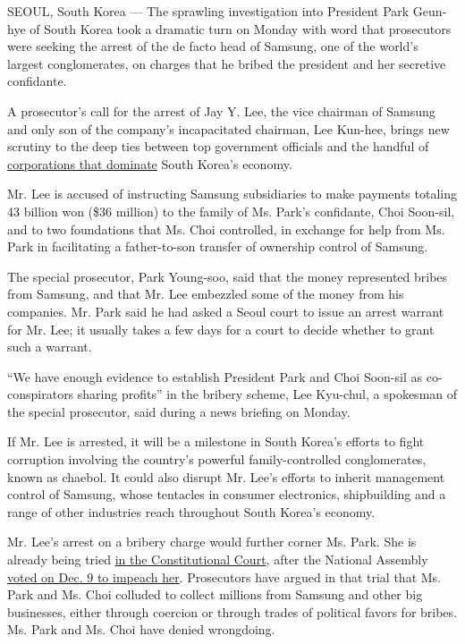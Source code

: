 SEOUL, South Korea --- The sprawling investigation into President Park
Geun-hye of South Korea took a dramatic turn on Monday with word that
prosecutors were seeking the arrest of the de facto head of Samsung, one
of the world's largest conglomerates, on charges that he bribed the
president and her secretive confidante.

A prosecutor's call for the arrest of Jay Y. Lee, the vice chairman of
Samsung and only son of the company's incapacitated chairman, Lee
Kun-hee, brings new scrutiny to the deep ties between top government
officials and the handful of
\href{https://www.nytimes3xbfgragh.onion/2017/01/02/world/asia/south-korea-park-geun-hye-samsung.html}{corporations
that dominate} South Korea's economy.

Mr. Lee is accused of instructing Samsung subsidiaries to make payments
totaling 43 billion won (\$36 million) to the family of Ms. Park's
confidante, Choi Soon-sil, and to two foundations that Ms. Choi
controlled, in exchange for help from Ms. Park in facilitating a
father-to-son transfer of ownership control of Samsung.

The special prosecutor, Park Young-soo, said that the money represented
bribes from Samsung, and that Mr. Lee embezzled some of the money from
his companies. Mr. Park said he had asked a Seoul court to issue an
arrest warrant for Mr. Lee; it usually takes a few days for a court to
decide whether to grant such a warrant.

``We have enough evidence to establish President Park and Choi Soon-sil
as co-conspirators sharing profits'' in the bribery scheme, Lee
Kyu-chul, a spokesman of the special prosecutor, said during a news
briefing on Monday.

If Mr. Lee is arrested, it will be a milestone in South Korea's efforts
to fight corruption involving the country's powerful family-controlled
conglomerates, known as chaebol. It could also disrupt Mr. Lee's efforts
to inherit management control of Samsung, whose tentacles in consumer
electronics, shipbuilding and a range of other industries reach
throughout South Korea's economy.

Mr. Lee's arrest on a bribery charge would further corner Ms. Park. She
is already being tried
\href{https://www.nytimes3xbfgragh.onion/2017/01/03/world/asia/south-korea-president-impeachment-trial.html}{in
the Constitutional Court}, after the National Assembly
\href{https://www.nytimes3xbfgragh.onion/2016/12/09/world/asia/south-korea-president-park-geun-hye-impeached.html}{voted
on Dec. 9 to impeach her}. Prosecutors have argued in that trial that
Ms. Park and Ms. Choi colluded to collect millions from Samsung and
other big businesses, either through coercion or through trades of
political favors for bribes. Ms. Park and Ms. Choi have denied
wrongdoing.

